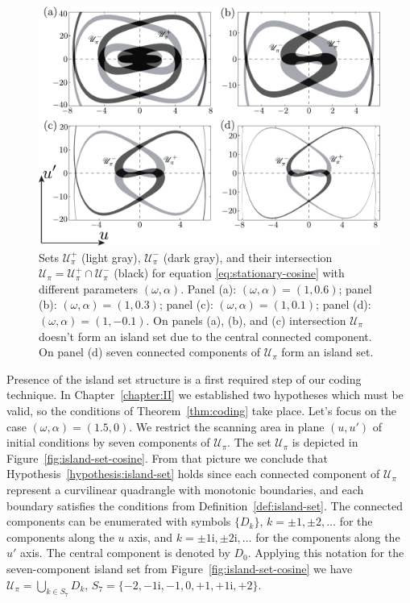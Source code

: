 \begin{figure}[h]
\centering
	\includegraphics[scale = 1]{pic/island set emergence for cosine equation}
	\caption{
		Sets $\mathscr{U}_{\pi}^+$ (light gray), $\mathscr{U}_{\pi}^-$ (dark gray), and their intersection $\mathscr{U}_{\pi} = \mathscr{U}_{\pi}^+ \cap \mathscr{U}_{\pi}^-$ (black) for equation \eqref{eq:stationary-cosine} with different parameters $(\omega, \alpha)$.
		Panel (a): $(\omega, \alpha) = (1, 0.6)$; panel (b): $(\omega, \alpha) = (1, 0.3)$; panel (c): $(\omega, \alpha) = (1, 0.1)$; panel (d): $(\omega, \alpha) = (1, -0.1)$.
		On panels (a), (b), and (c) intersection $\mathscr{U}_{\pi}$ doesn't form an island set due to the central connected component.
		On panel (d) seven connected components of $\mathscr{U}_{\pi}$ form an island set.
	}
\label{fig:island-set-emergence-cosine}
\end{figure}

Presence of the island set structure is a first required step of our coding technique.
In Chapter~\ref{chapter:II} we established two hypotheses which must be valid, so the conditions of Theorem~\ref{thm:coding} take place.
Let's focus on the case $(\omega, \alpha) = (1.5, 0)$.
We restrict the scanning area in plane $(u, u')$ of initial conditions by seven components of $\mathscr{U}_{\pi}$.
The set $\mathscr{U}_{\pi}$ is depicted in Figure~\ref{fig:island-set-cosine}.
From that picture we conclude that Hypothesis~\ref{hypothesis:island-set} holds since each connected component of $\mathscr{U}_{\pi}$ represent a curvilinear quadrangle with monotonic boundaries, and each boundary satisfies the conditions from Definition~\ref{def:island-set}.
The connected components can be enumerated with symbols $\{D_k\}$, $k = \pm 1, \pm 2, \dots$ for the components along the $u$ axis, and $k = \pm 1\mathrm{i}, \pm 2\mathrm{i}, \dots$ for the components along the $u'$ axis.
The central component is denoted by $D_0$.
Applying this notation for the seven-component island set from Figure~\ref{fig:island-set-cosine} we have $\mathscr{U}_{\pi} = \bigcup_{k \in S_7} D_k$, $S_7 = \{ -2, -1\mathrm{i}, -1, 0, +1, +1\mathrm{i}, +2 \}$.

